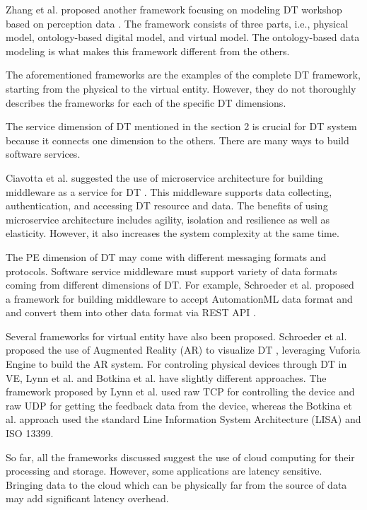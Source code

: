 \documentclass[article,table]{aaltoseries}
\begin{document}
Zhang et al. proposed another framework focusing on modeling DT workshop based on perception data \cite{Zhang2017}. The framework consists of three parts, i.e., physical model, ontology-based digital model, and virtual model. The ontology-based data modeling is what makes this framework different from the others.

The aforementioned frameworks are the examples of the complete DT framework, starting from the physical to the virtual entity. However, they do not thoroughly describes the frameworks for each of the specific DT dimensions.

The service dimension of DT mentioned in the section 2 is crucial for DT system because it connects one dimension to the others. There are many ways to build software services.

Ciavotta et al. suggested the use of microservice architecture for building middleware as a service for DT \cite{ciavotta2017microservice}. This middleware supports data collecting, authentication, and accessing DT resource and data. The benefits of using microservice architecture includes agility, isolation and resilience as well as elasticity. However, it also increases the system complexity at the same time.

The PE dimension of DT may come with different messaging formats and protocols. Software service middleware must support variety of data formats coming from different dimensions of DT. For example, Schroeder et al. proposed a framework for building middleware to accept AutomationML data format and and convert them into other data format via REST API \cite{Schroeder2016automationml}.

Several frameworks for virtual entity have also been proposed. Schroeder et al. proposed the use of Augmented Reality (AR) to visualize DT \cite{schroeder2016visualising}, leveraging Vuforia Engine to build the AR system. For controling physical devices through DT in VE, Lynn et al. \cite{lynn2018realization} and Botkina et al. \cite{botkina2018digital} have slightly different approaches. The framework proposed by Lynn et al. used raw TCP for controlling the device and raw UDP for getting the feedback data from the device, whereas the Botkina et al. approach used the standard Line Information System Architecture (LISA) and ISO 13399.

So far, all the frameworks discussed suggest the use of cloud computing for their processing and storage. However, some applications are latency sensitive. Bringing data to the cloud which can be physically far from the source of data may add significant latency overhead.
\end{document}
